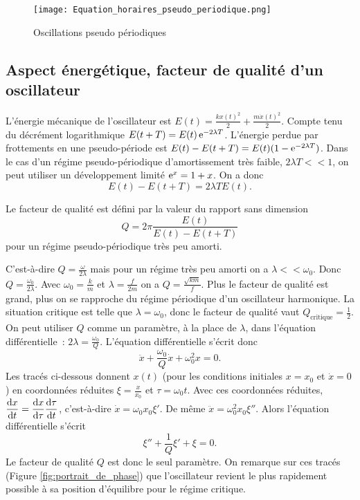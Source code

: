 \begin{figure}%
  \centering
  \texttt{[image: Equation\_horaires\_pseudo\_periodique.png]}%
  \caption{Oscillations pseudo périodiques}
  \label{fig:osc_pseudo_periodiques}
\end{figure}%
\subsection{Aspect énergétique, facteur de qualité d'un oscillateur}%
\label{chap5-subsec:aspecténergétique}%
%
L'énergie mécanique de l'oscillateur est \(E(t) = \frac{k x(t)^2}{2} + \frac{m
\dot x(t)^2}{2}\). Compte tenu du décrément logarithmique \(E(t+T) = E(t)
\operatorname{e}^{-2\lambda T}\). L'énergie perdue par frottements en une pseudo-période est
\(E(t)-E(t+T) = E(t)(1-\operatorname{e}^{-2\lambda T})\). Dans le cas d'un régime
pseudo-périodique d'amortissement très faible, \(2\lambda T << 1\), on peut
utiliser un développement limité \(\operatorname{e}^x = 1+x\). On a donc
\begin{equation}%
  E(t)-E(t+T) = 2\lambda T E(t).
\end{equation}%
\begin{defdef}%
  Le facteur de qualité est défini par la valeur du rapport sans dimension
  \begin{equation}
    Q = 2\pi \frac{E(t)}{E(t)-E(t+T)}
  \end{equation}
  pour un régime pseudo-périodique très peu amorti.
\end{defdef}%
%
C'est-à-dire \(Q = \frac{\omega}{2\lambda}\) mais pour un régime très peu
amorti on a \(\lambda << \omega_0\). Donc \(Q=\frac{\omega_0}{2\lambda}\). Avec
\(\omega_0=\frac{k}{m}\) et \(\lambda =\frac{f}{2m}\) on a
\(Q=\frac{\sqrt{km}}{f}\). Plus le facteur de qualité est grand, plus on se
rapproche du régime périodique d'un oscillateur harmonique. La situation
critique est telle que \(\lambda = \omega_0\), donc le facteur de qualité vaut
\(Q_{\text{critique}} = \frac{1}{2}\). On peut utiliser \(Q\) comme un
paramètre, à la place de \(\lambda\), dans l'équation différentielle~:
\(2\lambda = \frac{\omega_0}{Q}\). L'équation différentielle s'écrit donc
\begin{equation}%
  \ddot x +\frac{\omega_0}{Q} \dot x +\omega_0^2 x = 0.
\end{equation}%
%
Les tracés ci-dessous donnent \(x(t)\) (pour les conditions initiales \(x=x_0\)
et \(\dot x=0\)) en coordonnées réduites \(\xi=\frac{x}{x_0}\) et \(\tau =
\omega_0 t\). Avec ces coordonnées réduites, \(\dfrac{\mathrm{d} x}{\mathrm{d} t} =
\dfrac{\mathrm{d} x}{\mathrm{d} \tau} \dfrac{\mathrm{d} \tau}{\mathrm{d} t}\), c'est-à-dire \(\dot x = \omega_0 x_0
\xi'\). De même \(\ddot x = \omega_0^2 x_0 \xi''\). Alors l'équation
différentielle s'écrit
\begin{equation}%
  \xi'' +\frac{1}{Q} \xi'+\xi=0.
\end{equation}%
Le facteur de qualité \(Q\) est donc le seul paramètre. On remarque sur ces
tracés (Figure \ref{fig:portrait_de_phase}) que l'oscillateur revient le plus
rapidement possible à sa position d'équilibre pour le régime critique.

